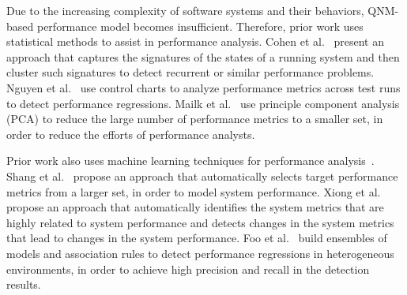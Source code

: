 Due to the increasing complexity of software systems and their behaviors, QNM-based performance model becomes insufficient. %
Therefore, prior work uses statistical methods to assist in performance analysis.
Cohen et al.~\citep{DBLP:conf/sosp/CohenZGSKF05} present an approach that captures the signatures of the states of a running system and then cluster such signatures to detect recurrent or similar performance problems. 
Nguyen et al.~\citep{DBLP:conf/apsec/NguyenAJHNF11,DBLP:conf/wosp/NguyenAJHNF12} use control charts to analyze performance metrics across test runs to detect performance regressions.
Mailk et al.~\citep{DBLP:conf/csmr/MalikJAHFH10,DBLP:conf/icse/MalikHH13} use principle component analysis (PCA) to reduce the large number of performance metrics to a smaller set, in order to reduce the efforts of performance analysts. %

Prior work also uses machine learning techniques for performance analysis~\citep{DBLP:conf/wosp/ShangHNF15,DBLP:conf/wosp/XiongPZG13,Foo:2015:ICS:2819009.2819034,DBLP:conf/icdm/LimLZFTLDZ14,DBLP:conf/wosp/DidonaQRT15}.
Shang et al.~\citep{DBLP:conf/wosp/ShangHNF15} propose an approach that automatically selects target performance metrics from a larger set, in order to model system performance. 
Xiong et al.~\citep{DBLP:conf/wosp/XiongPZG13} propose an approach that automatically identifies the system metrics that are highly related to system performance and detects changes in the system metrics that lead to changes in the system performance. 
Foo et al.~\citep{Foo:2015:ICS:2819009.2819034} build ensembles of models and association rules to detect performance regressions in heterogeneous environments, in order to achieve high precision and recall in the detection results.

